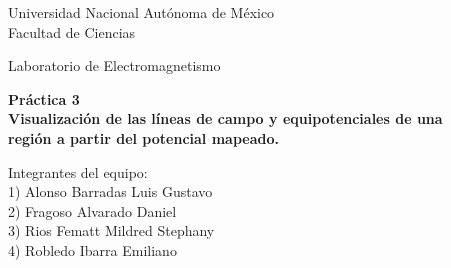 \documentclass[letterpaper, 11 pt]{article}
\begin{document}
\begin{center}
\vspace*{0.2in}
{\fontsize{21}{21}\selectfont Universidad Nacional Autónoma de México}\\
\vspace*{0.2in}
{\fontsize{18}{18}\selectfont Facultad de Ciencias}\\
\vspace*{0.2in}
\begin{large}
{\fontsize{14}{14}\selectfont Laboratorio de Electromagnetismo} \\
\end{large}
\vspace*{0.2in}
\vspace*{0.2in}
\begin{Large}
\textbf{Práctica 3} \\
\textbf{Visualización de las líneas de campo y equipotenciales de una \\ región a partir del potencial mapeado.} \\
\end{Large}
\vspace{.7 cm}
Integrantes del equipo:\\
1) Alonso Barradas Luis Gustavo\\ 
2) Fragoso Alvarado Daniel\\ 
3) Rios Fematt Mildred Stephany\\ 
4) Robledo Ibarra Emiliano\\

\end{center}
\end{document}
